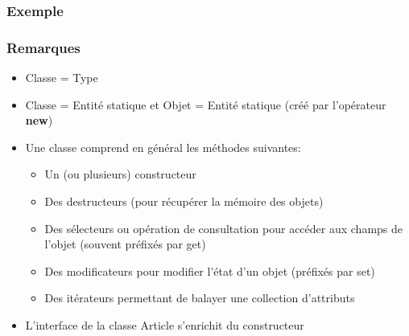 		\subsubsection{Exemple}
			
		\subsubsection{Remarques}
		\begin{itemize}
			\item Classe = Type	
			\item Classe = Entité statique et Objet = Entité statique (créé par l'opérateur \textbf{new})
			\item Une classe comprend en général les méthodes suivantes: 
				\begin{itemize}
					\item Un (ou plusieurs) constructeur 
					\item Des destructeurs (pour récupérer la mémoire des objets)
					\item Des sélecteurs ou opération de consultation pour accéder aux champs 
							de l'objet (souvent préfixés par get)
					\item Des modificateurs pour modifier l'état d'un objet (préfixés par set)
					\item Des itérateurs permettant de balayer une collection d'attributs
				\end{itemize}
			\item L'interface de la classe Article s'enrichit du constructeur 
		\end{itemize}

